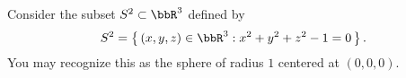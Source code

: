 \begin{questions}
  \question%
  Consider the subset $S^2\subset\bbR^3$ defined by
  \[
    S^2=\left\{\,(x,y,z)\in\bbR^3:x^2+y^2+z^2-1=0\,\right\}.
  \]
  You may recognize this as the sphere of radius $1$ centered at $(0,0,0)$.
\end{questions}

